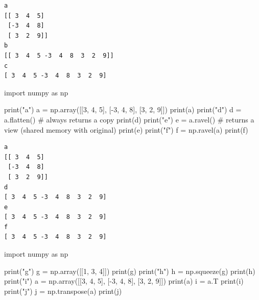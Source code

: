 \documentclass[
  polish,
  letterpaper,
  DIV=11,
  numbers=noendperiod]{scrreprt}
\newenvironment{Shaded}{\begin{snugshade}}{\end{snugshade}}
\newcommand{\BuiltInTok}[1]{\textcolor[rgb]{0.00,0.23,0.31}{#1}}
\newcommand{\CommentTok}[1]{\textcolor[rgb]{0.37,0.37,0.37}{#1}}
\newcommand{\DecValTok}[1]{\textcolor[rgb]{0.68,0.00,0.00}{#1}}
\newcommand{\ImportTok}[1]{\textcolor[rgb]{0.00,0.46,0.62}{#1}}
\newcommand{\NormalTok}[1]{\textcolor[rgb]{0.00,0.23,0.31}{#1}}
\newcommand{\OperatorTok}[1]{\textcolor[rgb]{0.37,0.37,0.37}{#1}}
\newcommand{\StringTok}[1]{\textcolor[rgb]{0.13,0.47,0.30}{#1}}
\begin{document}
\begin{verbatim}
a
[[ 3  4  5]
 [-3  4  8]
 [ 3  2  9]]
b
[[ 3  4  5 -3  4  8  3  2  9]]
c
[ 3  4  5 -3  4  8  3  2  9]
\end{verbatim}

\begin{Shaded}
\begin{Highlighting}[]
\ImportTok{import}\NormalTok{ numpy }\ImportTok{as}\NormalTok{ np}

\BuiltInTok{print}\NormalTok{(}\StringTok{"a"}\NormalTok{)}
\NormalTok{a }\OperatorTok{=}\NormalTok{ np.array([[}\DecValTok{3}\NormalTok{, }\DecValTok{4}\NormalTok{, }\DecValTok{5}\NormalTok{], [}\OperatorTok{{-}}\DecValTok{3}\NormalTok{, }\DecValTok{4}\NormalTok{, }\DecValTok{8}\NormalTok{], [}\DecValTok{3}\NormalTok{, }\DecValTok{2}\NormalTok{, }\DecValTok{9}\NormalTok{]])}
\BuiltInTok{print}\NormalTok{(a)}
\BuiltInTok{print}\NormalTok{(}\StringTok{"d"}\NormalTok{)}
\NormalTok{d }\OperatorTok{=}\NormalTok{ a.flatten()   }\CommentTok{\# always returns a copy}
\BuiltInTok{print}\NormalTok{(d)}
\BuiltInTok{print}\NormalTok{(}\StringTok{"e"}\NormalTok{)}
\NormalTok{e }\OperatorTok{=}\NormalTok{ a.ravel()     }\CommentTok{\# returns a view (shared memory with original)}
\BuiltInTok{print}\NormalTok{(e)}
\BuiltInTok{print}\NormalTok{(}\StringTok{"f"}\NormalTok{)}
\NormalTok{f }\OperatorTok{=}\NormalTok{ np.ravel(a)}
\BuiltInTok{print}\NormalTok{(f)}
\end{Highlighting}
\end{Shaded}

\begin{verbatim}
a
[[ 3  4  5]
 [-3  4  8]
 [ 3  2  9]]
d
[ 3  4  5 -3  4  8  3  2  9]
e
[ 3  4  5 -3  4  8  3  2  9]
f
[ 3  4  5 -3  4  8  3  2  9]
\end{verbatim}

\begin{Shaded}
\begin{Highlighting}[]
\ImportTok{import}\NormalTok{ numpy }\ImportTok{as}\NormalTok{ np}

\BuiltInTok{print}\NormalTok{(}\StringTok{"g"}\NormalTok{)}
\NormalTok{g }\OperatorTok{=}\NormalTok{ np.array([[}\DecValTok{1}\NormalTok{, }\DecValTok{3}\NormalTok{, }\DecValTok{4}\NormalTok{]])}
\BuiltInTok{print}\NormalTok{(g)}
\BuiltInTok{print}\NormalTok{(}\StringTok{"h"}\NormalTok{)}
\NormalTok{h }\OperatorTok{=}\NormalTok{ np.squeeze(g)}
\BuiltInTok{print}\NormalTok{(h)}
\BuiltInTok{print}\NormalTok{(}\StringTok{"i"}\NormalTok{)}
\NormalTok{a }\OperatorTok{=}\NormalTok{ np.array([[}\DecValTok{3}\NormalTok{, }\DecValTok{4}\NormalTok{, }\DecValTok{5}\NormalTok{], [}\OperatorTok{{-}}\DecValTok{3}\NormalTok{, }\DecValTok{4}\NormalTok{, }\DecValTok{8}\NormalTok{], [}\DecValTok{3}\NormalTok{, }\DecValTok{2}\NormalTok{, }\DecValTok{9}\NormalTok{]])}
\BuiltInTok{print}\NormalTok{(a)}
\NormalTok{i }\OperatorTok{=}\NormalTok{ a.T}
\BuiltInTok{print}\NormalTok{(i)}
\BuiltInTok{print}\NormalTok{(}\StringTok{"j"}\NormalTok{)}
\NormalTok{j }\OperatorTok{=}\NormalTok{ np.transpose(a)}
\BuiltInTok{print}\NormalTok{(j)}
\end{Highlighting}
\end{Shaded}
\end{document}
